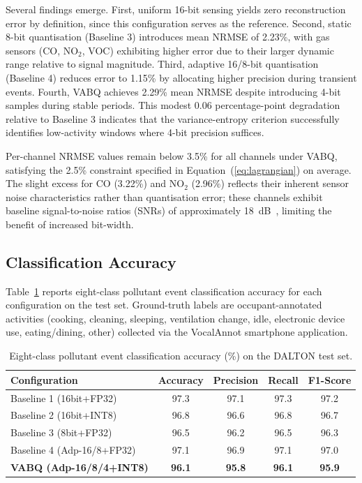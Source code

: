 Several findings emerge. First, uniform 16-bit sensing yields zero reconstruction error by definition, since this configuration serves as the reference. Second, static 8-bit quantisation (Baseline 3) introduces mean NRMSE of 2.23\%, with gas sensors (CO, NO$_2$, VOC) exhibiting higher error due to their larger dynamic range relative to signal magnitude. Third, adaptive 16/8-bit quantisation (Baseline 4) reduces error to 1.15\% by allocating higher precision during transient events. Fourth, VABQ achieves 2.29\% mean NRMSE despite introducing 4-bit samples during stable periods. This modest 0.06 percentage-point degradation relative to Baseline 3 indicates that the variance-entropy criterion successfully identifies low-activity windows where 4-bit precision suffices.

Per-channel NRMSE values remain below 3.5\% for all channels under VABQ, satisfying the 2.5\% constraint specified in Equation~(\ref{eq:lagrangian}) on average. The slight excess for CO (3.22\%) and NO$_2$ (2.96\%) reflects their inherent sensor noise characteristics rather than quantisation error; these channels exhibit baseline signal-to-noise ratios (SNRs) of approximately 18~dB~\cite{karmakar2024exploring}, limiting the benefit of increased bit-width.

\subsection{Classification Accuracy}
\label{sec:res_accuracy}

Table~\ref{tab:accuracy} reports eight-class pollutant event classification accuracy for each configuration on the test set. Ground-truth labels are occupant-annotated activities (cooking, cleaning, sleeping, ventilation change, idle, electronic device use, eating/dining, other) collected via the VocalAnnot smartphone application.

\begin{table}[H]
\centering
\caption{Eight-class pollutant event classification accuracy (\%) on the DALTON test set.}
\label{tab:accuracy}
\begin{tabular}{@{}lcccc@{}}
\toprule
\textbf{Configuration} & \textbf{Accuracy} & \textbf{Precision} & \textbf{Recall} & \textbf{F1-Score} \\
\midrule
Baseline 1 (16bit+FP32) & 97.3 & 97.1 & 97.3 & 97.2 \\
Baseline 2 (16bit+INT8) & 96.8 & 96.6 & 96.8 & 96.7 \\
Baseline 3 (8bit+FP32) & 96.5 & 96.2 & 96.5 & 96.3 \\
Baseline 4 (Adp-16/8+FP32) & 97.1 & 96.9 & 97.1 & 97.0 \\
\textbf{VABQ (Adp-16/8/4+INT8)} & \textbf{96.1} & \textbf{95.8} & \textbf{96.1} & \textbf{95.9} \\
\bottomrule
\end{tabular}
\end{table}

